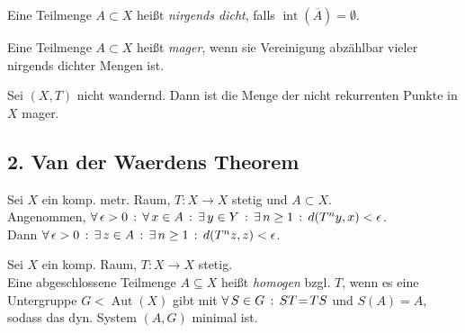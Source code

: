 \documentclass{cheat-sheet}
\DeclareMathOperator{\Aut}{Aut} %
\newcommand{\clos}[1]{\overline{#1}} %
\DeclareMathOperator{\inte}{int} %
\begin{document}

\begin{defn}
  Eine Teilmenge $A \!\subset\! X$  heißt \emph{nirgends dicht}, falls $\inte(\clos{A}) = \emptyset$.
\end{defn}

\begin{defn}
  Eine Teilmenge $A \!\subset\! X$ heißt \emph{mager}, wenn sie Vereinigung abzählbar vieler nirgends dichter Mengen ist.
\end{defn}

\begin{thm}
  Sei $(X, T)$ nicht wandernd. Dann ist die Menge der nicht rekurrenten Punkte in $X$ mager.
\end{thm}



\begin{samepage}
  \section{2. Van der Waerdens Theorem}
\end{samepage}



\begin{lem} %
  Sei $X$ ein komp. metr. Raum, $T \!:\! X \!\to\! X$ stetig und $A \!\subset\! X$. \\
  Angenommen, $\forall \, {\epsilon > 0} \,:\, \forall \, {x \in A} \,:\, \exists \, {y \in Y} \,:\, \exists \, {n \geq 1} \,:\, d(T^n y, x) < \epsilon$. \\
  Dann $\forall \, {\epsilon > 0} \,:\, \exists \, {z \in A} \,:\, \exists \, {n \geq 1} \,:\, d(T^n z, z) < \epsilon$.
\end{lem}

\begin{defn}
  Sei $X$ ein komp. Raum, $T : X \to X$ stetig. \\
  Eine abgeschlossene Teilmenge $A \subseteq X$ heißt \emph{homogen} bzgl. $T$, wenn es eine Untergruppe $G \!<\! \Aut(X)$ gibt mit $\forall \, {S \in G} \,:\, ST \!=\! TS$ und $S(A) \!=\! A$, sodass das dyn. System $(A, G)$ minimal ist.
\end{defn}
\end{document}
